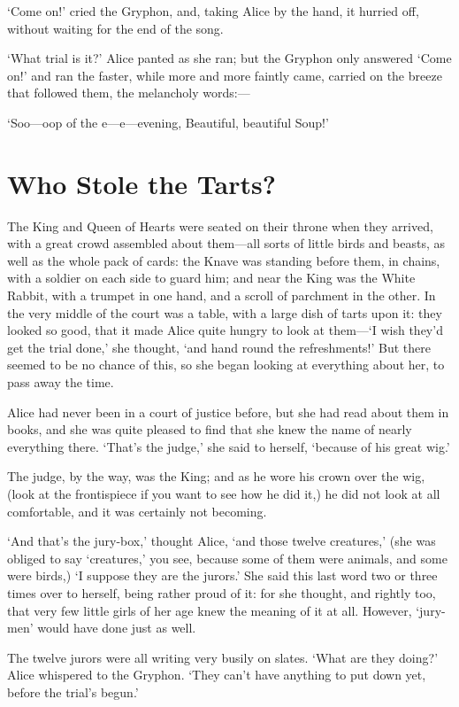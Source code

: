\documentclass[12pt]{book}
\begin{document}
\begin{Parallel}[p]{}{}
{‘Come on!’ cried the Gryphon, and, taking Alice by the hand, it hurried off, without waiting for the end of the song.

‘What trial is it?’ Alice panted as she ran; but the Gryphon only answered ‘Come on!’ and ran the faster, while more and more faintly came, carried on the breeze that followed them, the melancholy words:—

   ‘Soo—oop of the e—e—evening,
     Beautiful, beautiful Soup!’




\section{Who Stole the Tarts?}

The King and Queen of Hearts were seated on their throne when they arrived, with a great crowd assembled about them—all sorts of little birds and beasts, as well as the whole pack of cards: the Knave was standing before them, in chains, with a soldier on each side to guard him; and near the King was the White Rabbit, with a trumpet in one hand, and a scroll of parchment in the other. In the very middle of the court was a table, with a large dish of tarts upon it: they looked so good, that it made Alice quite hungry to look at them—‘I wish they’d get the trial done,’ she thought, ‘and hand round the refreshments!’ But there seemed to be no chance of this, so she began looking at everything about her, to pass away the time.

Alice had never been in a court of justice before, but she had read about them in books, and she was quite pleased to find that she knew the name of nearly everything there. ‘That’s the judge,’ she said to herself, ‘because of his great wig.’

The judge, by the way, was the King; and as he wore his crown over the wig, (look at the frontispiece if you want to see how he did it,) he did not look at all comfortable, and it was certainly not becoming.

‘And that’s the jury-box,’ thought Alice, ‘and those twelve creatures,’ (she was obliged to say ‘creatures,’ you see, because some of them were animals, and some were birds,) ‘I suppose they are the jurors.’ She said this last word two or three times over to herself, being rather proud of it: for she thought, and rightly too, that very few little girls of her age knew the meaning of it at all. However, ‘jury-men’ would have done just as well.

The twelve jurors were all writing very busily on slates. ‘What are they doing?’ Alice whispered to the Gryphon. ‘They can’t have anything to put down yet, before the trial’s begun.’

}
\end{Parallel}
\end{document}
